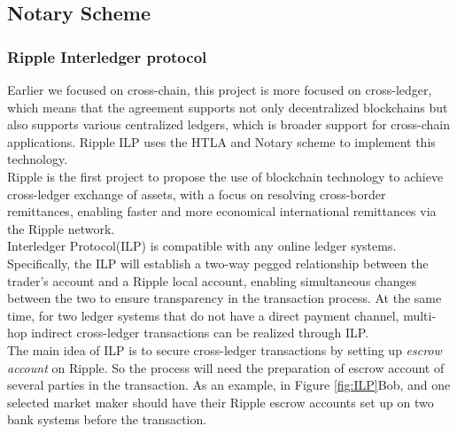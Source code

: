\subsection{Notary Scheme}
\label{sec:notary}
\subsubsection{Ripple Interledger protocol}
\label{subsec:interledger}
\noindent Earlier we focused on cross-chain, this project is more focused on cross-ledger, which means that the agreement supports not only decentralized blockchains but also supports various centralized ledgers, which is broader support for cross-chain applications. Ripple ILP\cite{thomas2015protocol} uses the HTLA and Notary scheme to implement this technology.\\
\noindent Ripple is the first project to propose the use of blockchain technology to achieve cross-ledger exchange of assets, with a focus on resolving cross-border remittances, enabling faster and more economical international remittances via the Ripple network.\\
\noindent Interledger Protocol(ILP) is compatible with any online ledger systems. Specifically, the ILP will establish a two-way pegged relationship between the trader's account and a Ripple local account, enabling simultaneous changes between the two to ensure transparency in the transaction process. At the same time, for two ledger systems that do not have a direct payment channel, multi-hop indirect cross-ledger transactions can be realized through ILP. \\
\noindent The main idea of ILP is to secure cross-ledger transactions by setting up \textit{escrow account} on Ripple. So the process will need the preparation of escrow account of several parties in the transaction. As an example, in Figure \ref{fig:ILP}Bob, and one selected market maker should have their Ripple escrow accounts set up on two bank systems before the transaction. \\
